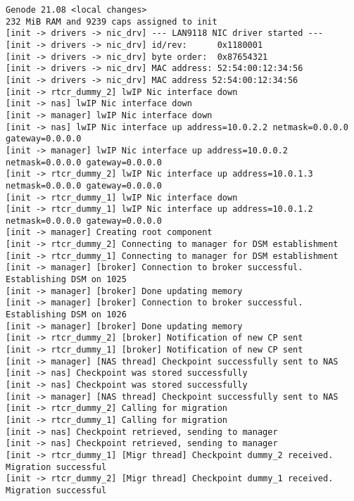 \begin{lstlisting}[caption={Output if no socket connections fail (warnings for invalid signal-context capability omitted).}]
Genode 21.08 <local changes>
232 MiB RAM and 9239 caps assigned to init
[init -> drivers -> nic_drv] --- LAN9118 NIC driver started ---
[init -> drivers -> nic_drv] id/rev:      0x1180001
[init -> drivers -> nic_drv] byte order:  0x87654321
[init -> drivers -> nic_drv] MAC address: 52:54:00:12:34:56
[init -> drivers -> nic_drv] MAC address 52:54:00:12:34:56
[init -> rtcr_dummy_2] lwIP Nic interface down
[init -> nas] lwIP Nic interface down
[init -> manager] lwIP Nic interface down
[init -> nas] lwIP Nic interface up address=10.0.2.2 netmask=0.0.0.0 gateway=0.0.0.0
[init -> manager] lwIP Nic interface up address=10.0.0.2 netmask=0.0.0.0 gateway=0.0.0.0
[init -> rtcr_dummy_2] lwIP Nic interface up address=10.0.1.3 netmask=0.0.0.0 gateway=0.0.0.0
[init -> rtcr_dummy_1] lwIP Nic interface down
[init -> rtcr_dummy_1] lwIP Nic interface up address=10.0.1.2 netmask=0.0.0.0 gateway=0.0.0.0
[init -> manager] Creating root component
[init -> rtcr_dummy_2] Connecting to manager for DSM establishment
[init -> rtcr_dummy_1] Connecting to manager for DSM establishment
[init -> manager] [broker] Connection to broker successful. Establishing DSM on 1025
[init -> manager] [broker] Done updating memory
[init -> manager] [broker] Connection to broker successful. Establishing DSM on 1026
[init -> manager] [broker] Done updating memory
[init -> rtcr_dummy_2] [broker] Notification of new CP sent
[init -> rtcr_dummy_1] [broker] Notification of new CP sent
[init -> manager] [NAS thread] Checkpoint successfully sent to NAS
[init -> nas] Checkpoint was stored successfully
[init -> nas] Checkpoint was stored successfully
[init -> manager] [NAS thread] Checkpoint successfully sent to NAS
[init -> rtcr_dummy_2] Calling for migration
[init -> rtcr_dummy_1] Calling for migration
[init -> nas] Checkpoint retrieved, sending to manager
[init -> nas] Checkpoint retrieved, sending to manager
[init -> rtcr_dummy_1] [Migr thread] Checkpoint dummy_2 received. Migration successful
[init -> rtcr_dummy_2] [Migr thread] Checkpoint dummy_1 received. Migration successful
\end{lstlisting}
